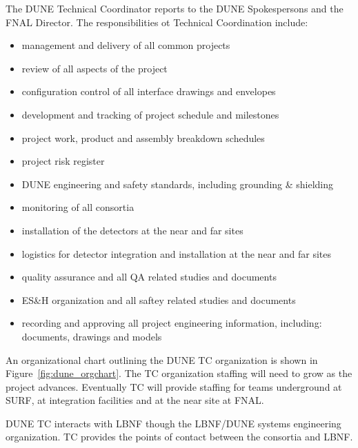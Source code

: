 The DUNE Technical Coordinator reports to the DUNE Spokespersons and the
FNAL Director. The responsibilities ot Technical Coordination include:
\begin{itemize}
  \item management and delivery of all common projects
  \item review of all aspects of the project
  \item configuration control of all interface drawings and envelopes
  \item development and tracking of project schedule and milestones
  \item project work, product and assembly breakdown schedules
  \item project risk register
  \item DUNE engineering and safety standards, including grounding \& shielding
  \item monitoring of all consortia
  \item installation of the detectors at the near and far sites
  \item logistics for detector integration and installation at the near and far sites
  \item quality assurance and all QA related studies and documents
  \item ES\&H organization and all saftey related studies and documents
  \item recording and approving all project engineering information, including: documents, drawings and models
\end {itemize}

An organizational chart outlining the DUNE TC organization is shown in
Figure~\ref{fig:dune_orgchart}. The TC organization staffing will need
to grow as the project advances. Eventually TC will provide staffing
for teams underground at SURF, at integration facilities and at the
near site at FNAL.

DUNE TC interacts with LBNF though the LBNF/DUNE systems engineering
organization. TC provides the points of contact between the consortia
and LBNF.
    




